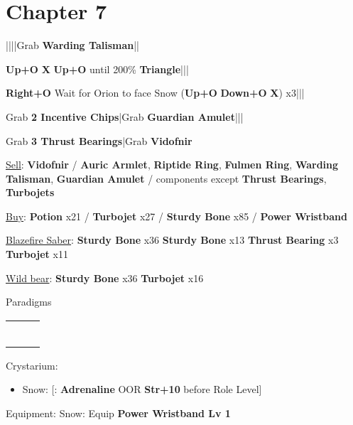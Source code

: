 \section{Chapter 7}
\begin{mainlist}
	\item {}|\skip|\skip|\skip|Grab \textbf{Warding Talisman}|\skip|
	\item {} \textbf{Up+O} \to \textbf{X} \to \textbf{Up+O} until 200\% \to \textbf{Triangle}|\skip||
	\item {} \textbf{Right+O} \to Wait for Orion to face Snow \to (\textbf{Up+O} \to \textbf{Down+O} \to \textbf{X}) x3|\skip||
	\item Grab \textbf{2 Incentive Chips}|Grab \textbf{Guardian Amulet}|\skip||\skip
	\item Grab \textbf{3 Thrust Bearings}|Grab \textbf{Vidofnir}
\end{mainlist}
\begin{shop}{\shopitem}
	\item \underline{Sell}: \textbf{Vidofnir} / \textbf{Auric Armlet}, \textbf{Riptide Ring}, \textbf{Fulmen Ring}, \textbf{Warding Talisman}, \textbf{Guardian Amulet} / components except \textbf{Thrust Bearings}, \textbf{Turbojets}
	\item \underline{Buy}: \textbf{Potion} x21 / \textbf{Turbojet} x27 / \textbf{Sturdy Bone} x85 / \textbf{Power Wristband}
\end{shop}
\begin{upgrade}
	\item \underline{Blazefire Saber}: \textbf{Sturdy Bone} x36 \to \textbf{Sturdy Bone} x13 \to \textbf{Thrust Bearing} x3 \to \textbf{Turbojet} x11
	\item \underline{Wild bear}: \textbf{Sturdy Bone} x36 \to \textbf{Turbojet} x16
\end{upgrade}
\begin{menu}
	\item Paradigms
	\begin{tabular}{ccl}
		\com          & \rav &  \\
		\com          & \med &          \\
		\sen          & \med &          \\
		\sen          & \syn &          \\
		\mkrole{\rav} & \rav &          \\
		\mkrole{\rav} & \rav &
	\end{tabular}
	\item Crystarium:
	\begin{itemize}
		\item Snow: [\com: \textbf{Adrenaline} OOR \to \textbf{Str+10} before Role Level]
	\end{itemize}
	\item Equipment: Snow: Equip \textbf{Power Wristband Lv 1}
\end{menu}
